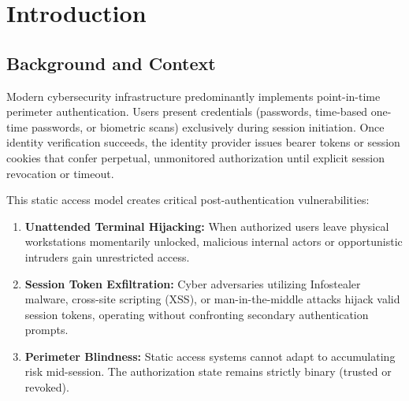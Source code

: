 \documentclass[12pt, a4paper, oneside]{report}
\begin{document}
\chapter{Introduction}

\section{Background and Context}
Modern cybersecurity infrastructure predominantly implements point-in-time perimeter authentication. Users present credentials (passwords, time-based one-time passwords, or biometric scans) exclusively during session initiation. Once identity verification succeeds, the identity provider issues bearer tokens or session cookies that confer perpetual, unmonitored authorization until explicit session revocation or timeout.

This static access model creates critical post-authentication vulnerabilities:
\begin{enumerate}
    \item \textbf{Unattended Terminal Hijacking:} When authorized users leave physical workstations momentarily unlocked, malicious internal actors or opportunistic intruders gain unrestricted access.
    \item \textbf{Session Token Exfiltration:} Cyber adversaries utilizing Infostealer malware, cross-site scripting (XSS), or man-in-the-middle attacks hijack valid session tokens, operating without confronting secondary authentication prompts.
    \item \textbf{Perimeter Blindness:} Static access systems cannot adapt to accumulating risk mid-session. The authorization state remains strictly binary (trusted or revoked).
\end{enumerate}
\end{document}
